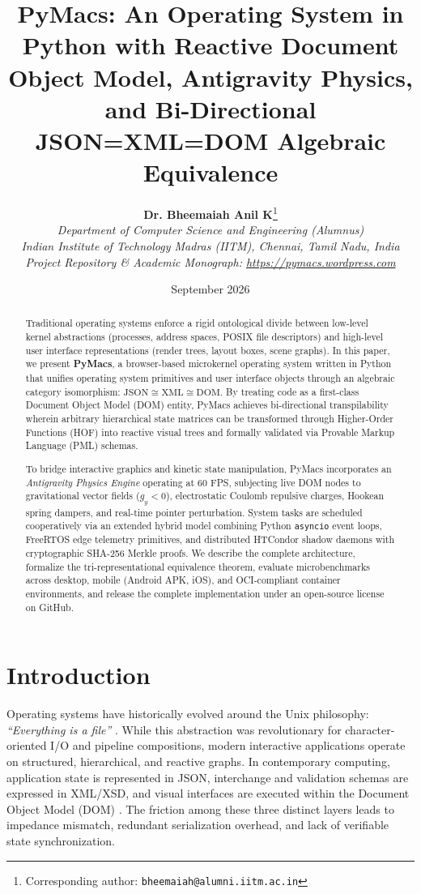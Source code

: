 \documentclass[10pt,twocolumn,letterpaper]{article}
\title{\textbf{PyMacs: An Operating System in Python with Reactive Document Object Model, Antigravity Physics, and Bi-Directional JSON=XML=DOM Algebraic Equivalence}}
\author{
    \textbf{Dr. Bheemaiah Anil K}\thanks{Corresponding author: \texttt{bheemaiah@alumni.iitm.ac.in}}\\
    \textit{Department of Computer Science and Engineering (Alumnus)}\\
    \textit{Indian Institute of Technology Madras (IITM), Chennai, Tamil Nadu, India}\\
    \textit{Project Repository \& Academic Monograph: \url{https://pymacs.wordpress.com}}
}
\date{September 2026}
\begin{document}
\maketitle

\begin{abstract}
Traditional operating systems enforce a rigid ontological divide between low-level kernel abstractions (processes, address spaces, POSIX file descriptors) and high-level user interface representations (render trees, layout boxes, scene graphs). In this paper, we present \textbf{PyMacs}, a browser-based microkernel operating system written in Python that unifies operating system primitives and user interface objects through an algebraic category isomorphism: $\mathrm{JSON} \cong \mathrm{XML} \cong \mathrm{DOM}$. By treating code as a first-class Document Object Model (DOM) entity, PyMacs achieves bi-directional transpilability wherein arbitrary hierarchical state matrices can be transformed through Higher-Order Functions (HOF) into reactive visual trees and formally validated via Provable Markup Language (PML) schemas. 

To bridge interactive graphics and kinetic state manipulation, PyMacs incorporates an \textit{Antigravity Physics Engine} operating at 60 FPS, subjecting live DOM nodes to gravitational vector fields ($g_y < 0$), electrostatic Coulomb repulsive charges, Hookean spring dampers, and real-time pointer perturbation. System tasks are scheduled cooperatively via an extended hybrid model combining Python \texttt{asyncio} event loops, FreeRTOS edge telemetry primitives, and distributed HTCondor shadow daemons with cryptographic SHA-256 Merkle proofs. We describe the complete architecture, formalize the tri-representational equivalence theorem, evaluate microbenchmarks across desktop, mobile (Android APK, iOS), and OCI-compliant container environments, and release the complete implementation under an open-source license on GitHub.
\end{abstract}

\section{Introduction}
Operating systems have historically evolved around the Unix philosophy: \textit{``Everything is a file''} \cite{ritchie1974unix}. While this abstraction was revolutionary for character-oriented I/O and pipeline compositions, modern interactive applications operate on structured, hierarchical, and reactive graphs. In contemporary computing, application state is represented in JSON, interchange and validation schemas are expressed in XML/XSD, and visual interfaces are executed within the Document Object Model (DOM) \cite{lehors2004dom}. The friction among these three distinct layers leads to impedance mismatch, redundant serialization overhead, and lack of verifiable state synchronization.
\end{document}
